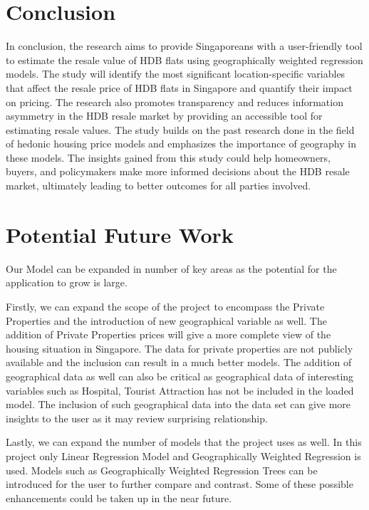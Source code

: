 \documentclass[manuscript,screen]{acmart}
\begin{document}
\hypertarget{conclusion}{%
\section{\texorpdfstring{\textbf{Conclusion}}{Conclusion}}\label{conclusion}}

In conclusion, the research aims to provide Singaporeans with a
user-friendly tool to estimate the resale value of HDB flats using
geographically weighted regression models. The study will identify the
most significant location-specific variables that affect the resale
price of HDB flats in Singapore and quantify their impact on pricing.
The research also promotes transparency and reduces information
asymmetry in the HDB resale market by providing an accessible tool for
estimating resale values. The study builds on the past research done in
the field of hedonic housing price models and emphasizes the importance
of geography in these models. The insights gained from this study could
help homeowners, buyers, and policymakers make more informed decisions
about the HDB resale market, ultimately leading to better outcomes for
all parties involved.

\hypertarget{potential-future-work}{%
\section{\texorpdfstring{\textbf{Potential Future
Work}}{Potential Future Work}}\label{potential-future-work}}

Our Model can be expanded in number of key areas as the potential for
the application to grow is large.

Firstly, we can expand the scope of the project to encompass the Private
Properties and the introduction of new geographical variable as well.
The addition of Private Properties prices will give a more complete view
of the housing situation in Singapore. The data for private properties
are not publicly available and the inclusion can result in a much better
models. The addition of geographical data as well can also be critical
as geographical data of interesting variables such as Hospital, Tourist
Attraction has not be included in the loaded model. The inclusion of
such geographical data into the data set can give more insights to the
user as it may review surprising relationship.

Lastly, we can expand the number of models that the project uses as
well. In this project only Linear Regression Model and Geographically
Weighted Regression is used. Models such as Geographically Weighted
Regression Trees can be introduced for the user to further compare and
contrast. Some of these possible enhancements could be taken up in the
near future.
\end{document}
